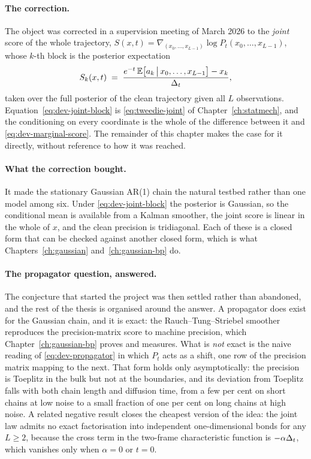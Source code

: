 \paragraph{The correction.} The object was corrected in a supervision meeting
of March 2026 to the \emph{joint} score of the whole trajectory,
$S(x,t) = \nabla_{(x_0,\dots,x_{L-1})} \log P_t(x_0,\dots,x_{L-1})$, whose
$k$-th block is the posterior expectation
\begin{equation}
  S_k(x,t) \;=\; \frac{e^{-t}\,\mathbb{E}\big[a_k \,\big|\, x_0,\dots,x_{L-1}\big] - x_k}{\Delta_t},
  \label{eq:dev-joint-block}
\end{equation}
taken over the full posterior of the clean trajectory given all $L$
observations. Equation~\eqref{eq:dev-joint-block} is
\eqref{eq:tweedie-joint} of Chapter~\ref{ch:statmech}, and the conditioning on
every coordinate is the whole of the difference between it and
\eqref{eq:dev-marginal-score}. The remainder of this chapter makes the case for
it directly, without reference to how it was reached.

\paragraph{What the correction bought.} It made the stationary Gaussian AR(1)
chain the natural testbed rather than one model among six. Under
\eqref{eq:dev-joint-block} the posterior is Gaussian, so the conditional mean
is available from a Kalman smoother, the joint score is linear in the whole of
$x$, and the clean precision is tridiagonal. Each of these is a closed form
that can be checked against another closed form, which is what
Chapters~\ref{ch:gaussian} and~\ref{ch:gaussian-bp} do.

\paragraph{The propagator question, answered.} The conjecture that started the project was then settled rather than
abandoned, and the rest of the thesis is organised around the answer. A
propagator does exist for the Gaussian chain, and it is exact: the
Rauch--Tung--Striebel smoother reproduces the precision-matrix score to machine
precision, which Chapter~\ref{ch:gaussian-bp} proves and measures. What is
\emph{not} exact is the naive reading of \eqref{eq:dev-propagator} in which
$P_t$ acts as a shift, one row of the precision matrix mapping to the next.
That form holds only asymptotically: the precision is Toeplitz in the bulk but
not at the boundaries, and its deviation from Toeplitz falls with both chain
length and diffusion time, from a few per cent on short chains at low noise to
a small fraction of one per cent on long chains at high noise. A related
negative result closes the cheapest version of the idea: the joint law admits
no exact factorisation into independent one-dimensional bonds for any $L \geq
2$, because the cross term in the two-frame characteristic function is
$-\alpha\Delta_t$, which vanishes only when $\alpha = 0$ or $t = 0$.

